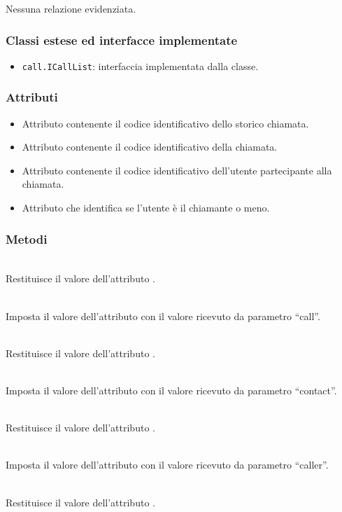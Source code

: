 Nessuna relazione evidenziata.

\subsubsection*{Classi estese ed interfacce implementate}
\begin{itemize}
	\item \texttt{call.ICallList}: interfaccia implementata dalla classe.
\end{itemize}

\subsubsection*{Attributi}

\begin{itemize}
	\item{}
	Attributo contenente il codice identificativo dello storico chiamata.
	\item{}
	Attributo contenente il codice identificativo della chiamata.
	\item{}
	Attributo contenente il codice identificativo dell'utente partecipante alla chiamata.
	\item{}
	Attributo che identifica se l'utente è il chiamante o meno.
\end{itemize}

\subsubsection*{Metodi}
\begin{description}
	\item{}\\
	Restituisce il valore dell'attributo .
	
	\item{}\\
	Imposta il valore dell'attributo  con il valore ricevuto da parametro ``call''.
	\item{}\\
	Restituisce il valore dell'attributo .
	
	\item{}\\
	Imposta il valore dell'attributo  con il valore ricevuto da parametro ``contact''.
	\item{}\\
	Restituisce il valore dell'attributo .
	
	\item{}\\
	Imposta il valore dell'attributo  con il valore ricevuto da parametro ``caller''.
	\item{}\\
	Restituisce il valore dell'attributo .
\end{description}

